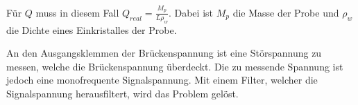 Für $Q$ muss in diesem Fall $Q_{real} = \frac{M_p}{L \rho_w}$. Dabei ist $M_p$ die Masse der Probe und $\rho_w$ die Dichte
eines Einkristalles der Probe.


An den Ausgangsklemmen der Brückenspannung ist eine Störspannung zu messen, welche die Brückenspannung überdeckt. Die
zu messende Spannung ist jedoch eine monofrequente Signalspannung. Mit einem Filter, welcher die Signalspannung herausfiltert,
wird das Problem gelöst.
